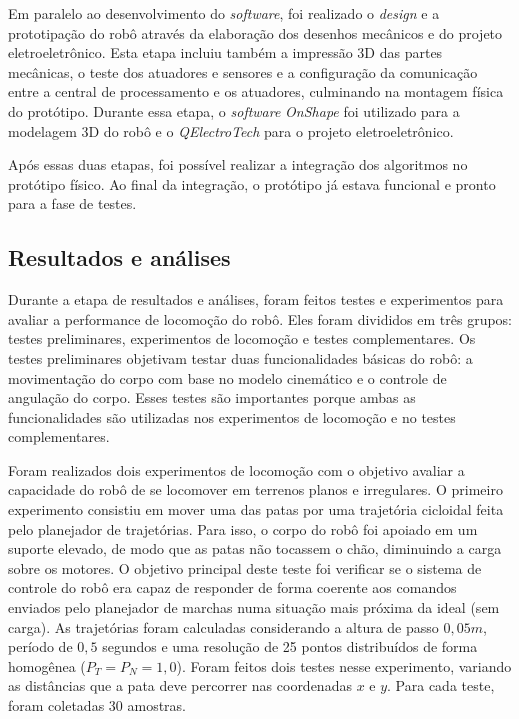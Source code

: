 \documentclass[../main.tex]{subfiles}
\begin{document}
  Em paralelo ao desenvolvimento do \textit{software}, foi realizado o \textit{design} e a prototipação do robô através da elaboração dos desenhos mecânicos e do projeto eletroeletrônico. Esta etapa incluiu também a impressão 3D das partes mecânicas, o teste dos atuadores e sensores e a configuração da comunicação entre a central de processamento e os atuadores, culminando na montagem física do protótipo. Durante essa etapa, o \textit{software} \textit{OnShape} foi utilizado para a modelagem 3D do robô e o \textit{QElectroTech} para o projeto eletroeletrônico.

  Após essas duas etapas, foi possível realizar a integração dos algoritmos no protótipo físico. Ao final da integração, o protótipo já estava funcional e pronto para a fase de testes.

  \subsection{Resultados e análises}
  \label{sec:method_results_analysis}
  Durante a etapa de resultados e análises, foram feitos testes e experimentos para avaliar a performance de locomoção do robô. Eles foram divididos em três grupos: testes preliminares, experimentos de locomoção e testes complementares. Os testes preliminares objetivam testar duas funcionalidades básicas do robô: a movimentação do corpo com base no modelo cinemático e o controle de angulação do corpo. Esses testes são importantes porque ambas as funcionalidades são utilizadas nos experimentos de locomoção e no testes complementares.
  
  Foram realizados dois experimentos de locomoção com o objetivo avaliar a capacidade do robô de se locomover em terrenos planos e irregulares. O primeiro experimento consistiu em mover uma das patas por uma trajetória cicloidal feita pelo planejador de trajetórias. Para isso, o corpo do robô foi apoiado em um suporte elevado, de modo que as patas não tocassem o chão, diminuindo a carga sobre os motores. O objetivo principal deste teste foi verificar se o sistema de controle do robô era capaz de responder de forma coerente aos comandos enviados pelo planejador de marchas numa situação mais próxima da ideal (sem carga). As trajetórias foram calculadas considerando a altura de passo $0,05m$, período de $0,5$ segundos e uma resolução de 25 pontos distribuídos de forma homogênea ($P_T = P_N = 1,0$). Foram feitos dois testes nesse experimento, variando as distâncias que a pata deve percorrer nas coordenadas $x$ e $y$. Para cada teste, foram coletadas 30 amostras.
  
\end{document}

